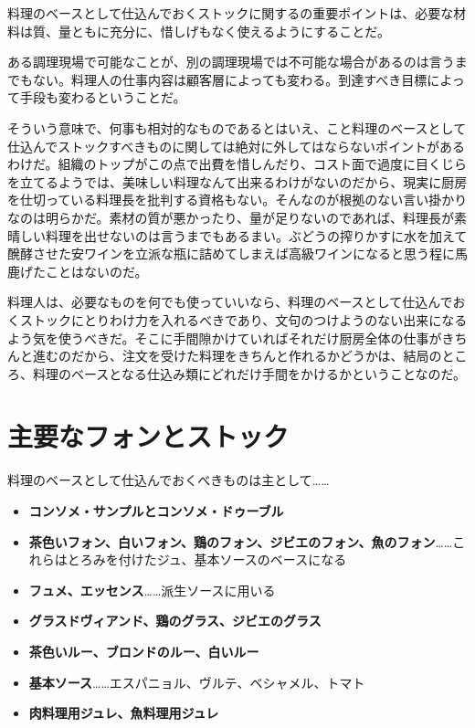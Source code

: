 料理のベースとして仕込んでおくストックに関するの重要ポイントは、必要な材料は質、量ともに充分に、惜しげもなく使えるようにすることだ。

ある調理現場で可能なことが、別の調理現場では不可能な場合があるのは言うまでもない。料理人の仕事内容は顧客層によっても変わる。到達すべき目標によって手段も変わるということだ。

そういう意味で、何事も相対的なものであるとはいえ、こと料理のベースとして仕込んでストックすべきものに関しては絶対に外してはならないポイントがあるわけだ。組織のトップがこの点で出費を惜しんだり、コスト面で過度に目くじらを立てるようでは、美味しい料理なんて出来るわけがないのだから、現実に厨房を仕切っている料理長を批判する資格もない。そんなのが根拠のない言い掛かりなのは明らかだ。素材の質が悪かったり、量が足りないのであれば、料理長が素晴しい料理を出せないのは言うまでもあるまい。ぶどうの搾りかすに水を加えて醗酵させた安ワインを立派な瓶に詰めてしまえば高級ワインになると思う程に馬鹿げたことはないのだ。

料理人は、必要なものを何でも使っていいなら、料理のベースとして仕込んでおくストックにとりわけ力を入れるべきであり、文句のつけようのない出来になるよう気を使うべきだ。そこに手間隙かけていればそれだけ厨房全体の仕事がきちんと進むのだから、注文を受けた料理をきちんと作れるかどうかは、結局のところ、料理のベースとなる仕込み類にどれだけ手間をかけるかということなのだ。

\newpage

\hypertarget{principaux-fonds-de-cuisine}{%
\section{主要なフォンとストック}\label{principaux-fonds-de-cuisine}}


料理のベースとして仕込んでおくべきものは主として\ldots{}\ldots{}

\begin{itemize}
\tightlist
\item
  \textbf{コンソメ・サンプルとコンソメ・ドゥーブル}
\item
  \textbf{茶色いフォン、白いフォン、鶏のフォン、ジビエのフォン、魚のフォン}\ldots{}\ldots{}これらはとろみを付けたジュ、基本ソースのベースになる
\item
  \textbf{フュメ、エッセンス}\ldots{}\ldots{}派生ソースに用いる
\item
  \textbf{グラスドヴィアンド、鶏のグラス、ジビエのグラス}
\item
  \textbf{茶色いルー、ブロンドのルー、白いルー}
\item
  \textbf{基本ソース}\ldots{}\ldots{}エスパニョル、ヴルテ、ベシャメル、トマト
\item
  \textbf{肉料理用ジュレ、魚料理用ジュレ}
\end{itemize}

